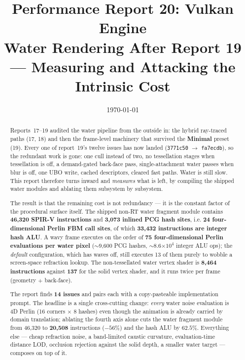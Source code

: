 \documentclass[11pt,a4paper]{article}
\title{Performance Report 20: Vulkan Engine \\
\large Water Rendering After Report 19 --- Measuring and Attacking the Intrinsic Cost}
\author{}
\date{\today}
\begin{document}
\maketitle

\begin{abstract}
Reports~17--19 audited the water pipeline from the outside in: the hybrid ray-traced paths (17, 18) and then the
frame-level machinery that survived the \textbf{Minimal} preset (19). Every one of report~19's twelve issues has now
landed (\texttt{3771c50} $\rightarrow$ \texttt{fa7ecdb}), so the redundant work is gone: one cull instead of two, no
tessellation stages when tessellation is off, a demand-gated back-face pass, single-attachment water passes when blur is
off, one UBO write, cached descriptors, cleared fast paths. Water is still slow. This report therefore turns inward and
\emph{measures} what is left, by compiling the shipped water modules and ablating them subsystem by subsystem.

The result is that the remaining cost is not redundancy --- it is the constant factor of the procedural surface itself.
The shipped non-RT water fragment module contains \textbf{46,320 SPIR-V instructions} and \textbf{3,073 inlined PCG hash
sites}, i.e. \textbf{24 four-dimensional Perlin FBM call sites}, of which \textbf{33,432 instructions are integer hash
ALU}. A wavy frame executes on the order of \textbf{75 four-dimensional Perlin evaluations per water pixel}
($\sim$9,600 PCG hashes, $\sim$8.6$\times10^4$ integer ALU ops); the \emph{default} configuration, which has waves off,
still executes 13 of them purely to wobble a screen-space refraction lookup. The non-tessellated water vertex shader is
\textbf{8,464 instructions} against \textbf{137} for the solid vertex shader, and it runs twice per frame (geometry $+$
back-face).

The report finds \textbf{14 issues} and pairs each with a copy-pasteable implementation prompt. The headline is a single
cross-cutting change: \emph{every} water noise evaluation is 4D Perlin (16 corners $\times$ 8 hashes) even though the
animation is already carried by domain translation; ablating the fourth axis alone cuts the water fragment module from
46,320 to \textbf{20,508} instructions ($-56\%$) and the hash ALU by $62.5\%$. Everything else --- cheap refraction
noise, a band-limited caustic curvature, evaluation-time distance LOD, occlusion rejection against the solid depth, a
smaller water target --- composes on top of it.
\end{abstract}
\end{document}
